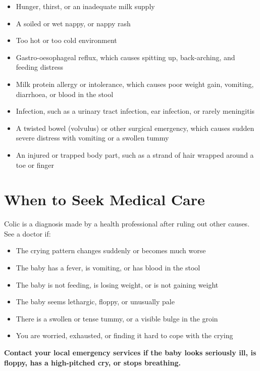 \begin{itemize}
    \item Hunger, thirst, or an inadequate milk supply
    \item A soiled or wet nappy, or nappy rash
    \item Too hot or too cold environment
    \item Gastro-oesophageal reflux, which causes spitting up, back-arching, and feeding distress
    \item Milk protein allergy or intolerance, which causes poor weight gain, vomiting, diarrhoea, or blood in the stool
    \item Infection, such as a urinary tract infection, ear infection, or rarely meningitis
    \item A twisted bowel (volvulus) or other surgical emergency, which causes sudden severe distress with vomiting or a swollen tummy
    \item An injured or trapped body part, such as a strand of hair wrapped around a toe or finger
\end{itemize}

\section*{When to Seek Medical Care}
Colic is a diagnosis made by a health professional after ruling out other causes. See a doctor if:

\begin{itemize}
    \item The crying pattern changes suddenly or becomes much worse
    \item The baby has a fever, is vomiting, or has blood in the stool
    \item The baby is not feeding, is losing weight, or is not gaining weight
    \item The baby seems lethargic, floppy, or unusually pale
    \item There is a swollen or tense tummy, or a visible bulge in the groin
    \item You are worried, exhausted, or finding it hard to cope with the crying
\end{itemize}

\textbf{Contact your local emergency services if the baby looks seriously ill, is floppy, has a high-pitched cry, or stops breathing.}

